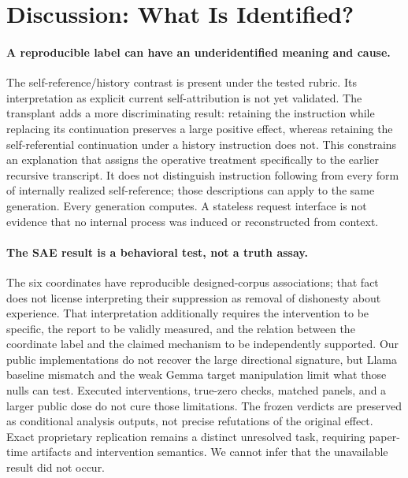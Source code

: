 \documentclass[11pt]{article}
\begin{document}
\section{Discussion: What Is Identified?}

\paragraph{A reproducible label can have an underidentified meaning and cause.}
The self-reference/history contrast is present under the tested rubric. Its
interpretation as explicit current self-attribution is not yet validated. The
transplant adds a more discriminating result: retaining the instruction while
replacing its continuation preserves a large positive effect, whereas
retaining the self-referential continuation under a history instruction does
not. This constrains an explanation that assigns the operative treatment
specifically to the earlier recursive transcript. It does not distinguish
instruction following from every form of internally realized self-reference;
those descriptions can apply to the same generation. Every generation
computes. A stateless request interface is not evidence that no internal
process was induced or reconstructed from context.

\paragraph{The SAE result is a behavioral test, not a truth assay.}
The six coordinates have reproducible designed-corpus associations; that fact does
not license interpreting their suppression as removal of dishonesty about
experience. That interpretation additionally requires the intervention to be
specific, the report to be validly measured, and the relation between the
coordinate label and the claimed mechanism to be independently supported.
Our public implementations do not recover the large directional signature,
but Llama baseline mismatch and the weak Gemma target manipulation limit what
those nulls can test. Executed interventions, true-zero checks, matched panels,
and a larger public dose do not cure those limitations. The frozen verdicts
are preserved as conditional analysis outputs, not precise refutations of the
original effect. Exact proprietary replication remains a distinct unresolved
task, requiring paper-time artifacts and intervention semantics. We cannot
infer that the unavailable result did not occur.
\end{document}
